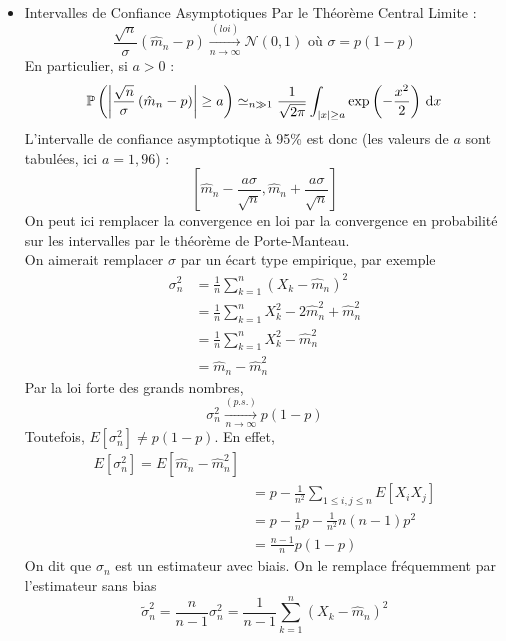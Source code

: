\documentclass{cours}
\begin{document}
\begin{itemize}
    \item Intervalles de Confiance Asymptotiques
          Par le Théorème Central Limite :
          \[
              \frac{\sqrt{n}}{\sigma}\left(\hat{m}_{n} - p\right) \xrightarrow[n \to \infty]{(loi)} \mathcal{N}(0, 1) \text{ où } \sigma = p(1-p)
          \]
          En particulier, si $a > 0$ :
          \[
              \mathbb{P}\left(\left|\frac{\sqrt{n}}{\sigma}\left(\hat{m}_{n} - p\right)\right| \geq a\right) \simeq_{n \gg 1} \frac{1}{\sqrt{2\pi}} \int_{\left|x\right| \geq a} \exp\left(-\frac{x^{2}}{2}\right) {\rm \, d} x
          \]
          L'intervalle de confiance asymptotique à 95\% est donc (les valeurs de $a$ sont tabulées, ici $a = 1,96$) :
          \[
              \left[\hat{m}_{n} - \frac{a\sigma}{\sqrt{n}}, \hat{m}_{n} + \frac{a\sigma}{\sqrt{n}}\right]
          \]
          On peut ici remplacer la convergence en loi par la convergence en probabilité sur les intervalles par le théorème de Porte-Manteau.\\
          On aimerait remplacer $\sigma$ par un écart type empirique, par exemple
          \[
              \begin{aligned}
                  \sigma_{n}^{2} & = \frac{1}{n} \sum_{k = 1}^{n} \left(X_{k} - \hat{m}_{n}\right)^{2}          \\
                                 & = \frac{1}{n}\sum_{k = 1}^{n} X_{k}^{2} - 2\hat{m}_{n}^{2} + \hat{m}_{n}^{2} \\
                                 & = \frac{1}{n}\sum_{k = 1}^{n} X_{k}^{2} - \hat{m}_{n}^{2}                    \\
                                 & = \hat{m}_{n} - \hat{m}_{n}^{2}
              \end{aligned}
          \]
          Par la loi forte des grands nombres,
          \[
              \sigma_{n}^{2} \xrightarrow[n \to \infty]{(p.s.)} p(1-p)
          \]
          Toutefois, $E[\sigma_{n}^{2}] \neq p(1 - p)$.
          En effet,
          \[
              \begin{aligned}
                  E[\sigma_{n}^{2}] = E[\hat{m}_{n} - \hat{m}_{n}^{2}]            \\
                   & = p - \frac{1}{n^{2}}\sum_{1 \leq i, j \leq n} E[X_{i}X_{j}] \\
                   & = p - \frac{1}{n}p - \frac{1}{n^{2}}n(n-1)p^{2}              \\
                   & = \frac{n - 1}{n}p(1-p)
              \end{aligned}
          \]
          On dit que $\sigma_{n}$ est un estimateur avec biais. On le remplace fréquemment par l'estimateur sans bias
          \[
              \tilde{\sigma}_{n}^{2} = \frac{n}{n - 1} \sigma_{n}^{2} = \frac{1}{n - 1} \sum_{k = 1}^{n} \left(X_{k} - \hat{m}_{n}\right)^{2}
          \]


\end{itemize}
\end{document}
